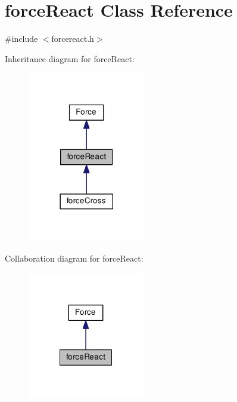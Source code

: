 \hypertarget{classforce_react}{\section{force\-React Class Reference}
\label{classforce_react}
}


{\ttfamily \#include $<$forcereact.\-h$>$}



Inheritance diagram for force\-React\-:\nopagebreak
\begin{figure}[H]
\begin{center}
\leavevmode
\includegraphics[width=146pt]{classforce_react__inherit__graph}
\end{center}
\end{figure}


Collaboration diagram for force\-React\-:\nopagebreak
\begin{figure}[H]
\begin{center}
\leavevmode
\includegraphics[width=144pt]{classforce_react__coll__graph}
\end{center}
\end{figure}
